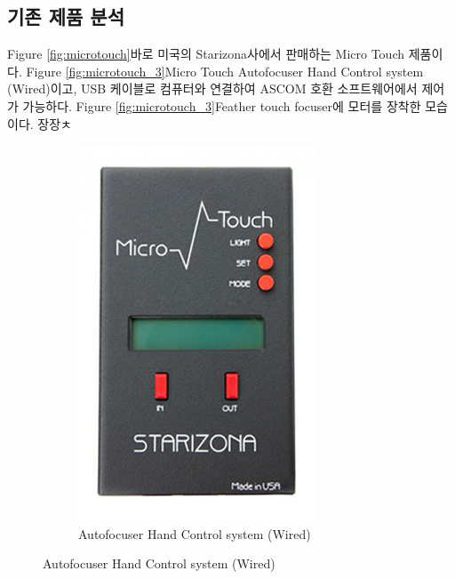 \subsection{기존 제품 분석}

Figure \ref{fig:microtouch}\가 바로 미국의 Starizona사에서 판매하는 Micro Touch  제품이다. Figure \ref{fig:microtouch_3}\가 Micro Touch Autofocuser Hand Control system (Wired)이고, USB 케이블로 컴퓨터와 연결하여 ASCOM 호환 소프트웨어에서 제어가 가능하다.  Figure \ref{fig:microtouch_3}\는 Feather touch focuser에 모터를 장착한 모습이다. 장장ㅊ


\begin{figure}[h]
	\begin{center}
		\begin{subfigure}{0.45\textwidth}
			\includegraphics[width=0.9\linewidth]{microtouch_3} 
			\caption{Autofocuser Hand Control system (Wired)}

\end{subfigure}
\end{center}
\end{figure}
